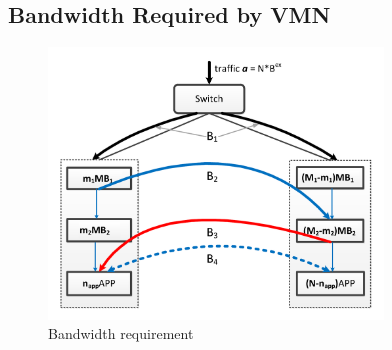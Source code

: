 \documentclass[review]{elsarticle}
\begin{document}
\subsection{Bandwidth Required by VMN}


\begin{figure}
	\centering
	     \includegraphics[width=3.5in]{fig/bandwidth_requirement3.pdf}
	\caption{Bandwidth requirement}
	\label{fig:bw}
\end{figure}
\end{document}
